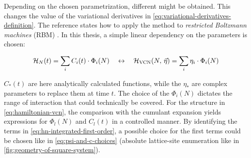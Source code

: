 Depending on the chosen parametrization, different \Hvcn{\vec{\eta}} might be obtained. 
This changes the value of the variational derivatives in \autoref{eq:variational-derivatives-definition}.
The reference \cite{VCNsolutionForRBM} states how to apply the method to \emph{restricted Boltzmann machines} (RBM) \cite{neuralNetworkQuantumStates}.
In this thesis, a simple linear dependency on the parameters is chosen:

\begin{equation}
    \label{eq:hamiltonian-vcn}
    \HNOft = \lsum[i] C_i(t) \cdot \Phi_i(N) \quad\leftrightarrow\quad \Hvcn{\vec{\eta}} = \lsum[i] \eta_i \cdot \Phi_i(N)
\end{equation}

$C_\ast(t)$ are here analytically calculated functions, while the $\eta_\ast$ are complex parameters to replace them at time $t$.
The choice of the $\Phi_i(N)$ dictates the range of interaction that could technically be covered.
For the structure in \autoref{eq:hamiltonian-vcn}, the comparison with the cumulant expansion yields expressions for $\Phi_l(N)$ and $C_l(t)$ in a controlled manner.
By identifying the terms in \autoref{eq:hn-integrated-first-order}, a possible choice for the first terms could be chosen like in \autoref{eq:psi-and-c-choices} (absolute lattice-site enumeration like in \autoref{fig:geometry-of-square-system}). 


